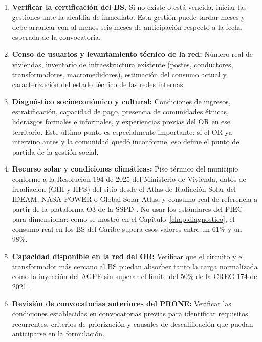 \begin{enumerate}[label=\textbf{\arabic*.}, leftmargin=1.8cm, itemsep=6pt]

    \item \textbf{Verificar la certificación del BS.} Si no existe o
    está vencida, iniciar las gestiones ante la alcaldía de inmediato.
    Esta gestión puede tardar meses y debe arrancar con al menos seis
    meses de anticipación respecto a la fecha esperada de la convocatoria.

    \item \textbf{Censo de usuarios y levantamiento técnico de la red:}
    Número real de viviendas, inventario de infraestructura existente
    (postes, conductores, transformadores, macromedidores), estimación
    del consumo actual y caracterización del estado técnico de las redes
    internas.

    \item \textbf{Diagnóstico socioeconómico y cultural:} Condiciones
    de ingresos, estratificación, capacidad de pago, presencia de
    comunidades étnicas, liderazgos formales e informales, y experiencias
    previas del OR en ese territorio. Este último punto es especialmente
    importante: si el OR ya intervino antes y la comunidad quedó
    inconforme, eso define el punto de partida de la gestión social.

    \item \textbf{Recurso solar y condiciones climáticas:} Piso térmico
    del municipio conforme a la Resolución 194 de 2025 del Ministerio
    de Vivienda, datos de irradiación (GHI y HPS) del sitio desde el
    Atlas de Radiación Solar del IDEAM, NASA POWER o Global Solar Atlas,
    y consumo real de referencia a partir de la plataforma O3 de la SSPD
    \parencite{SSPD2025, UPME2025}. No usar los estándares del PIEC
    para dimensionar: como se mostró en el Capítulo~\ref{chap:diagnostico},
    el consumo real en los BS del Caribe supera esos valores entre un
    61\% y un 98\%.

    \item \textbf{Capacidad disponible en la red del OR:} Verificar que
    el circuito y el transformador más cercano al BS puedan absorber
    tanto la carga normalizada como la inyección del AGPE sin superar
    el límite del 50\% de la CREG 174 de 2021
    \parencite{ResolucionCREG174_2021}.

    \item \textbf{Revisión de convocatorias anteriores del PRONE:}
    Verificar las condiciones establecidas en convocatorias previas para
    identificar requisitos recurrentes, criterios de priorización y
    causales de descalificación que puedan anticiparse en la formulación.
\end{enumerate}

